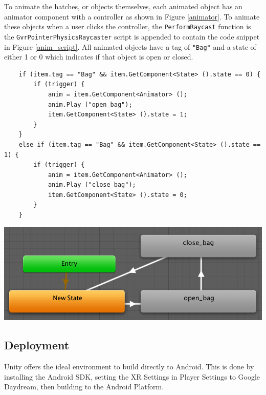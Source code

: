 \documentclass[ %
                    author={Elis Jones},
                supervisor={Dr. Kirsten Cater},
                    degree={BSc},
                     title={The Effect of Presentation Medium on Spatial Cognition},
                  subtitle={in the Virtual Environment},
                      year={2018} ]{dissertation}
\begin{document}
To animate the hatches, or objects themselves, each animated object has an animator component with a controller as shown in Figure \ref{animator}. To animate these objects when a user clicks the controller, the \lstinline{PerformRaycast} function is the \lstinline{GvrPointerPhysicsRaycaster} script is appended to contain the code snippet in Figure \ref{anim_script}. All animated objects have a tag of \lstinline{"Bag"} and a state of either 1 or 0 which indicates if that object is open or closed. 

\begin{center}
    \centering
    \begin{minipage}{0.6\textwidth}
    \begin{lstlisting}
	if (item.tag == "Bag" && item.GetComponent<State> ().state == 0) {
		if (trigger) {
			anim = item.GetComponent<Animator> ();
			anim.Play ("open_bag");
			item.GetComponent<State> ().state = 1;
		}
	}	
	else if (item.tag == "Bag" && item.GetComponent<State> ().state == 1) {
		if (trigger) {
			anim = item.GetComponent<Animator> ();
			anim.Play ("close_bag");
			item.GetComponent<State> ().state = 0;
		} 
	}

    \end{lstlisting}
    \label{anim_script}
    \end{minipage}\hfill
    \begin{minipage}{0.35\textwidth}
        \centering
        \includegraphics[width=1\textwidth]{images/animator.png}
        \label{animator}
    \end{minipage}
\end{center}

\subsection{Deployment}
Unity offers the ideal environment to build directly to Android. This is done by installing the Android SDK, setting the XR Settings in Player Settings to Google Daydream, then building to the Android Platform. 
\end{document}
